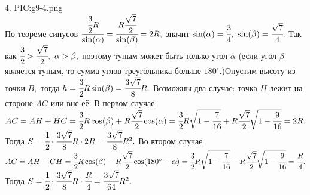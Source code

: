 4. {{PIC:g9-4.png}}\\
По теореме синусов $\cfrac{\cfrac{3}{2}R}{\sin(\alpha)}=\cfrac{R\cfrac{\sqrt{7}}{2}}{\sin(\beta)}=2R,$ значит $\sin(\alpha)=\cfrac{3}{4},\ \sin(\beta)=\cfrac{\sqrt{7}}{4}.$ Так как $\cfrac{3}{2}>\cfrac{\sqrt{7}}{2},\ \alpha>\beta,$ поэтому тупым может быть только угол $\alpha$ (если угол $\beta$ является тупым, то сумма углов треугольника больше $180^\circ.$)Опустим высоту из точки $B,$ тогда $h=\cfrac{3}{2}R \sin(\beta)=\cfrac{3\sqrt{7}}{8}R.$ Возможны два случае: точка $H$ лежит на стороне $AC$ или вне её. В первом случае $AC=AH+HC=\cfrac{3}{2}R \cos(\beta)+R\cfrac{\sqrt{7}}{2}\cos(\alpha)=
\cfrac{3}{2}R \sqrt{1-\cfrac{7}{16}}+R\cfrac{\sqrt{7}}{2}\sqrt{1-\cfrac{9}{16}}=2R.$ Тогда $S=\cfrac{1}{2}\cdot\cfrac{3\sqrt{7}}{8}R\cdot
2R=\cfrac{3\sqrt{7}}{8}R^2.$ Во втором случае $AC=AH-CH=\cfrac{3}{2}R \cos(\beta)-R\cfrac{\sqrt{7}}{2}\cos(180^\circ-\alpha)=
\cfrac{3}{2}R \sqrt{1-\cfrac{7}{16}}-R\cfrac{\sqrt{7}}{2}\sqrt{1-\cfrac{9}{16}}=\cfrac{R}{4}.$ Тогда $S=\cfrac{1}{2}\cdot\cfrac{3\sqrt{7}}{8}R\cdot\cfrac{R}{4}=\cfrac{3\sqrt{7}}{64}R^2.$\\
